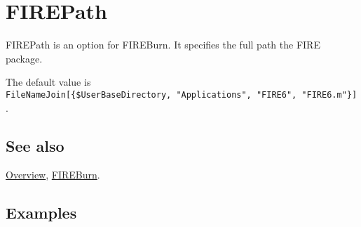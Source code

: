 \documentclass[../FeynHelpersManual.tex]{subfiles}
\begin{document}
\hypertarget{firepath}{
\section{FIREPath}\label{firepath}}

FIREPath is an option for FIREBurn. It specifies the full path the FIRE
package.

The default value is
\texttt{FileNameJoin[\allowbreak{}\{\allowbreak{}\$UserBaseDirectory,\ \allowbreak{}"Applications",\ \allowbreak{}"FIRE6",\ \allowbreak{}"FIRE6.m"\}]}.

\subsection{See also}

\hyperlink{toc}{Overview}, \hyperlink{fireburn}{FIREBurn}.

\subsection{Examples}
\end{document}
